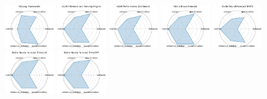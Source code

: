 \begin{figure}[ht!]
\centering
\includegraphics[width=0.1900\textwidth]{images/sglang_framework_radar.pdf}
\includegraphics[width=0.1900\textwidth]{images/vllm_inference_and_serving_engine_radar.pdf}
\includegraphics[width=0.1900\textwidth]{images/vllm_performance_dashboard_radar.pdf}
\includegraphics[width=0.1900\textwidth]{images/nixtla_neuralforecast_radar.pdf}
\includegraphics[width=0.1900\textwidth]{images/nixtla_neural_forecast_nhits_radar.pdf}
\\[1ex]
\includegraphics[width=0.1900\textwidth]{images/nixtla_neural_forecast_timellm_radar.pdf}
\includegraphics[width=0.1900\textwidth]{images/nixtla_neural_forecast_timegpt_radar.pdf}

\end{figure}
